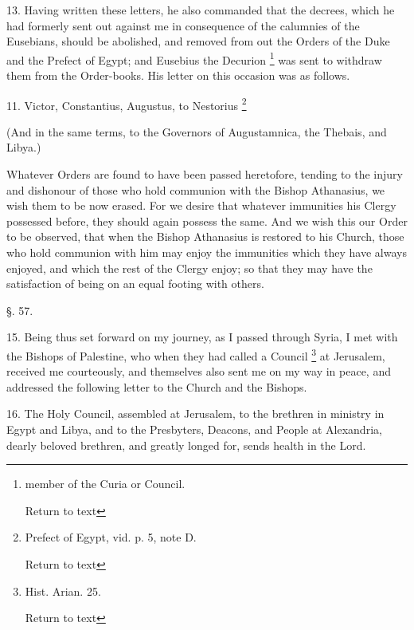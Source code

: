 13. Having written these letters, he also
commanded that the decrees, which he had formerly sent out against me
in consequence of the calumnies of the Eusebians, should be abolished,
and removed from out the Orders of the Duke and the Prefect of Egypt;
and Eusebius the Decurion \footnote{member of the Curia or Council.

Return to text}
was sent to withdraw them from the Order-books. His letter on this
occasion was as follows.

11. Victor, Constantius, Augustus, to Nestorius \footnote{Prefect of Egypt, vid. p. 5, note D.

Return to text}

(And in the same terms, to the Governors of
Augustamnica, the Thebais, and Libya.)

Whatever Orders are found to have been passed
heretofore, tending to the injury and dishonour of those who hold
communion with the Bishop Athanasius, we wish them to be now erased.
For we desire that whatever immunities his Clergy possessed before,
they should again possess the same. And we wish this our Order to
be observed, that when the Bishop Athanasius is restored to his
Church, those who hold communion with him may enjoy the immunities
which they have always enjoyed, and which the rest of the Clergy
enjoy; so that they may have the satisfaction of being on an equal
footing with others.

§. 57.

15. Being thus set forward on my journey, as I
passed through Syria, I met with the Bishops of Palestine, who when
they had called a Council \footnote{Hist. Arian. 25.

Return to text}
at Jerusalem, received me courteously, and themselves also sent me on
my way in peace, and addressed the following letter to the Church and
the Bishops.

16. The Holy Council, assembled at Jerusalem, to
the brethren in ministry in Egypt and Libya, and to the Presbyters,
Deacons, and People at Alexandria, dearly beloved brethren, and
greatly longed for, sends health in the Lord.

